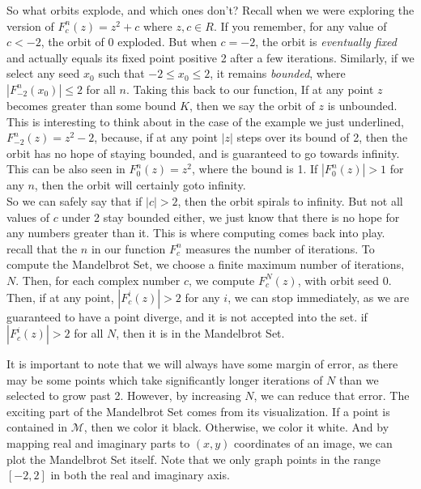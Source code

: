 \documentclass[20pt]{article} %
\begin{document}
So what orbits explode, and which ones don't? Recall when we were exploring the version of $F_c^{n}(z)=z^{2}+c$ where $z,c\in \!R$.  If you remember, for any value of $c < -2$, the orbit of 0 exploded. But when $c=-2$, the orbit is \textit{eventually fixed} and actually equals its fixed point positive 2 after a few iterations. Similarly, if we select any seed $x_0$ such that $-2 \leq x_0 \leq 2$, it remains \textit{bounded}, where $|F_{-2}^{n}(x_0)| \leq 2$ for all $n$.  Taking this back to our function, If at any point $z$ becomes greater than some bound $K$, then we say the orbit of $z$ is unbounded.  This is interesting to think about in the case of the example we just underlined, $F_{-2}^{n}(z)=z^{2}-2$, because, if at any point $|z|$ steps over its bound of 2, then the orbit has no hope of staying bounded, and is guaranteed to go towards infinity.  This can be also seen in $F_0^{n}(z)=z^{2}$, where the bound is 1.  If $|F_0^{n}(z)| > 1$ for any $n$, then the orbit will certainly goto infinity. \\

So we can safely say that if $|c|>2$, then the orbit spirals to infinity.  But not all values of $c$ under 2 stay bounded either, we just know that there is no hope for any numbers greater than it. This is where computing comes back into play.  recall that the $n$ in our function $F_c^{n}$ measures the number of iterations.  To compute the Mandelbrot Set, we choose a finite maximum number of iterations, $N$.  Then, for each complex number $c$, we compute $F_c^{N}(z)$, with orbit seed 0.  Then, if at any point, $|F_c^{i}(z)| > 2$ for any $i$, we can stop immediately, as we are guaranteed to have a point diverge, and it is not accepted into the set.  if $|F_c^{i}(z)| > 2$ for all $N$, then it is in the Mandelbrot Set. 

It is important to note that we will always have some margin of error, as there may be some points which take significantly longer iterations of $N$ than we selected to grow past 2. However, by increasing $N$, we can reduce that error.  The exciting part of the Mandelbrot Set comes from its visualization.  If a point is contained in $\mathcal{M}$, then we color it black. Otherwise, we color it white.  And by mapping real and imaginary parts to $(x,y)$ coordinates of an image, we can plot the Mandelbrot Set itself.  Note that we only graph points in the range $[-2,2]$ in both the real and imaginary axis.
\end{document}
